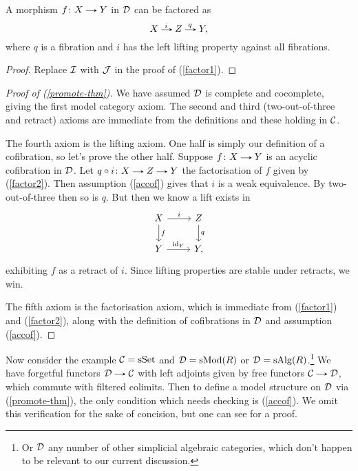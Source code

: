 \begin{lemma}
  \label{factor2}
  A morphism $f \c X \to Y$ in $\mathcal{D}$ can be factored as
  \[
  X \lblto{i} Z \lblto{q} Y,
  \]
  where $q$ is a fibration and $i$ has the left lifting property
  against all fibrations.
\end{lemma}

\begin{proof}
  Replace $\mathcal{I}$ with $\mathcal{J}$ in the proof of (\ref{factor1}).
\end{proof}


\begin{proof}[Proof of (\ref{promote-thm})]
  We have assumed $\mathcal{D}$ is complete and cocomplete, giving the first
  model category axiom. The second and third (two-out-of-three and
  retract) axioms are immediate from the definitions and these holding
  in $\mathcal{C}$.

  The fourth axiom is the lifting axiom. One half is simply our
  definition of a cofibration, so let's prove the other half. Suppose
  $f \c X \to Y$ is an acyclic cofibration in $\mathcal{D}$. Let $q \circ i \c X
  \to Z \to Y$ the factorisation of $f$ given by (\ref{factor2}). Then
  assumption (\ref{accof}) gives that $i$ is a weak equivalence. By
  two-out-of-three then so is $q$. But then we know a lift exists in
  \[
  \begin{tikzcd}
    X \rar{i} \dar{f} & Z \dar{q} \\ Y \rar{\id_Y} & Y,
  \end{tikzcd}
  \]
  exhibiting $f$ as a retract of $i$. Since lifting properties are
  stable under retracts, we win.

  The fifth axiom is the factorisation axiom, which is immediate from
  (\ref{factor1}) and (\ref{factor2}), along with the definition of
  cofibrations in $\mathcal{D}$ and assumption (\ref{accof}).
\end{proof}

\begin{nothing}
  \label{relevant-model}
  Now consider the example $\mathcal{C} = \mathrm{s}\mathrm{Set}$ and $\mathcal{D} = \mathrm{s}\mathrm{Mod}(R)$ or $\mathcal{D} =
  \mathrm{s}\mathrm{Alg}(R)$.\footnote{Or $\mathcal{D}$ any number of other simplicial
    algebraic categories, which don't happen to be relevant to our
    current discussion.}  We have forgetful functors $\D \to \C$ with
  left adjoints given by free functors $\C \to \D$, which commute with
  filtered colimits. Then to define a model structure on $\mathcal{D}$ via
  (\ref{promote-thm}), the only condition which needs checking is
  (\ref{accof}). We omit this verification for the sake of concision,
  but one can see \cite{goerssjardine} for a proof.
\end{nothing}

